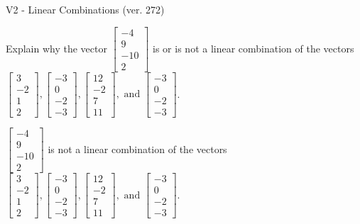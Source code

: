 \begin{exercise}
  \begin{exerciseTitle}V2 - Linear Combinations (ver. 272)\end{exerciseTitle}
  \begin{exerciseStatement}
    Explain why the vector \(\left[\begin{array}{c}
-4 \\
9 \\
-10 \\
2
\end{array}\right]\)  is or is not a linear 
	combination of the vectors \(\left[\begin{array}{c}
3 \\
-2 \\
1 \\
2
\end{array}\right] , \left[\begin{array}{c}
-3 \\
0 \\
-2 \\
-3
\end{array}\right] , \left[\begin{array}{c}
12 \\
-2 \\
7 \\
11
\end{array}\right] , \text{ and } \left[\begin{array}{c}
-3 \\
0 \\
-2 \\
-3
\end{array}\right]\).
	


  \end{exerciseStatement}
  \begin{exerciseAnswer}
   \(\left[\begin{array}{c}
-4 \\
9 \\
-10 \\
2
\end{array}\right]\) 
  	 is not  
	a linear combination of the vectors \(\left[\begin{array}{c}
3 \\
-2 \\
1 \\
2
\end{array}\right] , \left[\begin{array}{c}
-3 \\
0 \\
-2 \\
-3
\end{array}\right] , \left[\begin{array}{c}
12 \\
-2 \\
7 \\
11
\end{array}\right] , \text{ and } \left[\begin{array}{c}
-3 \\
0 \\
-2 \\
-3
\end{array}\right]\).


\end{exerciseAnswer}
\end{exercise}
